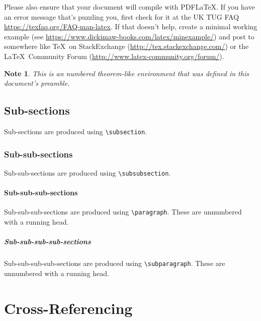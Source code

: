 \documentclass[pmlr,twocolumn,10pt]{jmlr} %
\newtheorem*{note}{Note}
\begin{document}
Please also ensure that your document will compile with PDF\LaTeX.
If you have an error message that's puzzling you, first check for it
at the UK TUG FAQ
\url{https://texfaq.org/FAQ-man-latex}.  If
that doesn't help, create a minimal working example (see
\url{https://www.dickimaw-books.com/latex/minexample/}) and post
to somewhere like \TeX\ on StackExchange
(\url{http://tex.stackexchange.com/}) or the \LaTeX\ Community Forum
(\url{http://www.latex-community.org/forum/}).

\begin{note}
This is an numbered theorem-like environment that was defined in
this document's preamble.
\end{note}

\subsection{Sub-sections}

Sub-sections are produced using \verb|\subsection|.

\subsubsection{Sub-sub-sections}

Sub-sub-sections are produced using \verb|\subsubsection|.

\paragraph{Sub-sub-sub-sections}

Sub-sub-sub-sections are produced using \verb|\paragraph|.
These are unnumbered with a running head.

\subparagraph{Sub-sub-sub-sub-sections}

Sub-sub-sub-sub-sections are produced using \verb|\subparagraph|.
These are unnumbered with a running head.

\section{Cross-Referencing}
\end{document}
